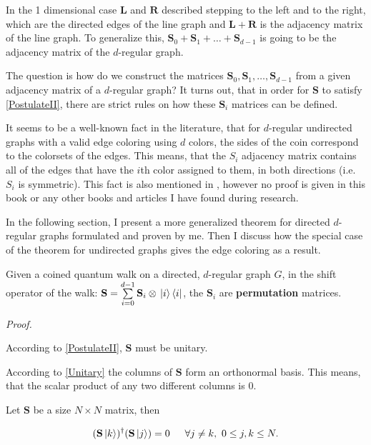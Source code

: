 In the 1 dimensional case $\mathbf{L}$ and $\mathbf{R}$ described stepping to the left and to the right, which are
the directed edges of the line graph and $\mathbf{L} + \mathbf{R}$ is the adjacency matrix of the line graph. To generalize this, $\mathbf{S}_0 + \mathbf{S}_1 + \dots + \mathbf{S}_{d-1}$ is going to be the adjacency matrix of the $d$-regular graph.

The question is how do we construct the matrices $\mathbf{S}_0, \mathbf{S}_1, \dots, \mathbf{S}_{d-1}$ from a given adjacency matrix of a $d$-regular graph? It turns out, that in order for $\mathbf{S}$ to satisfy \hyperref[PostulateII]{[PostulateII]}, there are strict rules on how these $\mathbf{S}_i$ matrices can be defined.

It seems to be a well-known fact in the literature, that for $d$-regular undirected graphs with a valid edge coloring using $d$ colors, the sides of the coin correspond to the colorsets of the edges. This means, that the $S_i$ adjacency matrix contains all of the edges that have the $i$th color assigned to them, in both directions (i.e. $S_i$ is symmetric). This fact is also mentioned in \cite{Portugal}, however no proof is given in this book or any other books and articles I have found during research.

In the following section, I present a more generalized theorem for directed $d$-regular graphs formulated and proven by me. Then I discuss how the special case of the theorem for undirected graphs gives the edge coloring as a result.

\begin{theorem}
Given a coined quantum walk on a directed, $d$-regular graph $G$, in the shift operator of the walk: $\mathbf{S} = \sum\limits_{i=0}^{d-1} \mathbf{S}_i \otimes{} \ket{i}\bra{i}$, the $\mathbf{S}_{i}$ are \textbf{permutation} matrices.
\end{theorem}

\textit{Proof.}

According to \hyperref[PostulateII]{[PostulateII]}, $\mathbf{S}$ must be unitary.

According to \hyperref[Unitary]{[Unitary]} the columns of $\mathbf{S}$ form an orthonormal basis. This means, that the scalar product of any two different columns is $0$.

Let $\mathbf{S}$ be a size $N\times{}N$ matrix, then

\begin{align*}
    (\mathbf{S}\ket{k})^{\dagger}(\mathbf{S}\ket{j}) = 0 \hspace{15pt}{} \forall{}j\neq{}k,\ 0\leq{}j,k\leq{}N.
\end{align*}

